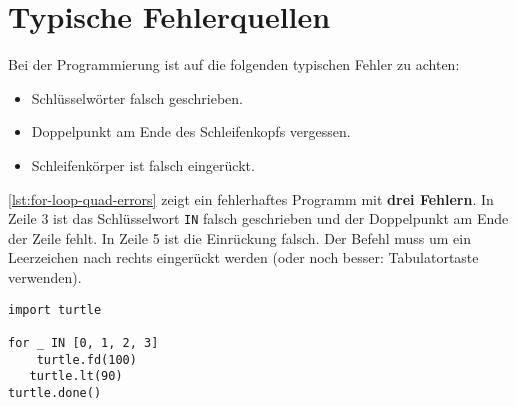 
\section{Typische Fehlerquellen}

Bei der Programmierung ist auf die folgenden typischen Fehler zu achten:

\begin{itemize}
\item Schlüsselwörter falsch geschrieben.
\item Doppelpunkt am Ende des Schleifenkopfs vergessen.
\item Schleifenkörper ist falsch eingerückt.
\end{itemize}
\autoref{lst:for-loop-quad-errors} zeigt ein fehlerhaftes Programm mit \textbf{drei Fehlern}. In Zeile \num{3} ist das Schlüsselwort \lstinline[language={python3}]{IN} falsch geschrieben und der Doppelpunkt am Ende der Zeile fehlt. In Zeile \num{5} ist die Einrückung falsch. Der Befehl muss um ein Leerzeichen nach rechts eingerückt werden (oder noch besser: Tabulatortaste verwenden).

\begin{lstlisting}[language={python3}, caption={Achtung, dies ist ein \textbf{fehlerhaftes} Programm.}, label={lst:for-loop-quad-errors}]
import turtle

for _ IN [0, 1, 2, 3]
	turtle.fd(100)
   turtle.lt(90)
turtle.done()

\end{lstlisting}



